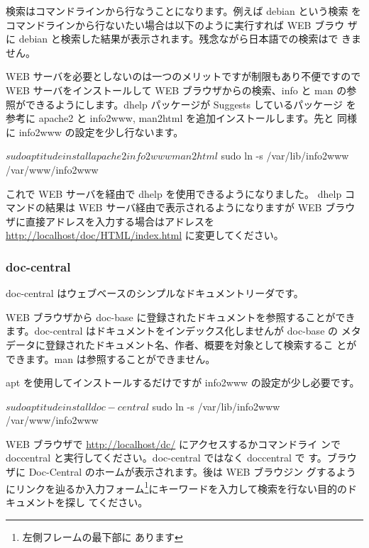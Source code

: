 \documentclass[mingoth,a4paper]{jsarticle}
\begin{document}
検索はコマンドラインから行なうことになります。例えば debian という検索
をコマンドラインから行ないたい場合は以下のように実行すれば WEB ブラウ
ザに debian と検索した結果が表示されます。残念ながら日本語での検索はで
きません。



WEB サーバを必要としないのは一つのメリットですが制限もあり不便ですので
WEB サーバをインストールして WEB ブラウザからの検索、info と man の参
照ができるようにします。dhelp パッケージが Suggests しているパッケージ
を参考に apache2 と info2www, man2html を追加インストールします。先と
同様に info2www の設定を少し行ないます。

\begin{commandline}
  $ sudo aptitude install apache2 info2www man2html
  $ sudo ln -s /var/lib/info2www /var/www/info2www
\end{commandline}

これで WEB サーバを経由で dhelp を使用できるようになりました。
dhelp コマンドの結果は WEB サーバ経由で表示されるようになりますが WEB
ブラウザに直接アドレスを入力する場合はアドレスを
\url{http://localhost/doc/HTML/index.html} に変更してください。


\subsubsection{doc-central}
doc-central はウェブベースのシンプルなドキュメントリーダです。

WEB ブラウザから doc-base に登録されたドキュメントを参照することができ
ます。doc-central はドキュメントをインデックス化しませんが doc-base の
メタデータに登録されたドキュメント名、作者、概要を対象として検索するこ
とができます。man は参照することができません。


apt を使用してインストールするだけですが info2www の設定が少し必要です。

\begin{commandline}
  $ sudo aptitude install doc-central
  $ sudo ln -s /var/lib/info2www /var/www/info2www
\end{commandline}


WEB ブラウザで \url{http://localhost/dc/} にアクセスするかコマンドライ
ンで doccentral と実行してください。doc-central ではなく doccentral で
す。ブラウザに Doc-Central のホームが表示されます。後は WEB ブラウジン
グするようにリンクを辿るか入力フォーム\footnote{左側フレームの最下部に
  あります}にキーワードを入力して検索を行ない目的のドキュメントを探し
てください。
\end{document}
